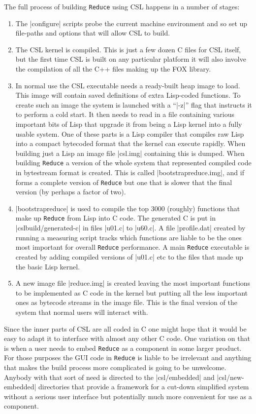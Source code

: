 \documentclass[12pt,twoside,openright]{memoir}
\newcommand{\reduce}{\texttt{Reduce}\xspace}
\begin{document}
The full process of building \reduce using CSL happens in a number
of stages:
\begin{enumerate}
\item The |configure| scripts probe the current machine environment and
so set up file-paths and options that will allow CSL to build.
\item The CSL kernel is compiled. This is just a few dozen C files for
CSL itself, but the first time CSL is built on any particular platform it
will also involve the compilation of all the C++ files making up the FOX
library.
\item In normal use the CSL executable needs a ready-built heap image to
load. This image will contain saved definitions of extra Lisp-coded
functions. To create such an image the system is launched with a ``|-z|''
flag that instructs it to perform a cold start. It then needs to read in
a file containing various important bits of Lisp that upgrade it from
being a Lisp kernel into a fully usable system. One of these parts is a
Lisp compiler that compiles raw Lisp into a compact bytecoded format that
the kernel can execute rapidly. When building just a Lisp an image file
|csl.img| containing this is dumped. When building \reduce a version of
the whole system that represented compiled code in bytestream format is
created. This is called |bootstrapreduce.img|, and if forms a complete
version of \reduce but one that is slower that the final version (by perhaps
a factor of two).
\item |bootstrapreduce| is used to compile the top 3000 (roughly) functions
that make up \reduce from Lisp into C code. The generated C is put
in |cslbuild/generated-c| in files |u01.c| to |u60.c|. A file |profile.dat|
created by running a measuring script tracks which functions are liable to be
the ones most important for overall \reduce performance. A main \reduce
executable is created by adding compiled versions of |u01.c| etc to the
files that made up the basic Lisp kernel.
\item A new image file |reduce.img| is created leaving the most important
functions to be implemented as C code in the kernel but putting all the
less important ones as bytecode streams in the image file. This is the final
version of the system that normal users will interact with.
\end{enumerate}

Since the inner parts of CSL are all coded in C one might hope that it
would be easy to adapt it to interface with almost any other C code. One
variation on that is when a user needs to embed \reduce as a component in some
larger product. For those purposes the GUI code in \reduce is liable to
be irrelevant and anything that makes the build process more complicated
is going to be unwelcome. Anybody with that sort of need is directed to
the |csl/embedded| and |csl/new-embedded| directories that provide a
framework for a cut-down simplified system without a serious user interface
but potentially much more convenient for use as a component.
\end{document}
